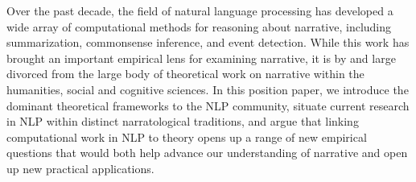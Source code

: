 Over the past decade, the field of natural language processing has developed a wide array of  computational methods for reasoning about narrative, including summarization, commonsense inference, and event detection. While this work has brought an important empirical lens for examining narrative, it is by and large divorced from the large body of theoretical work on narrative within the humanities, social and cognitive sciences.  In this position paper, we introduce the dominant theoretical frameworks to the NLP community, situate current research in NLP within distinct narratological traditions, and argue that linking computational work in NLP to theory opens up a range of new empirical questions that would both help advance our understanding of narrative and open up new practical applications.
